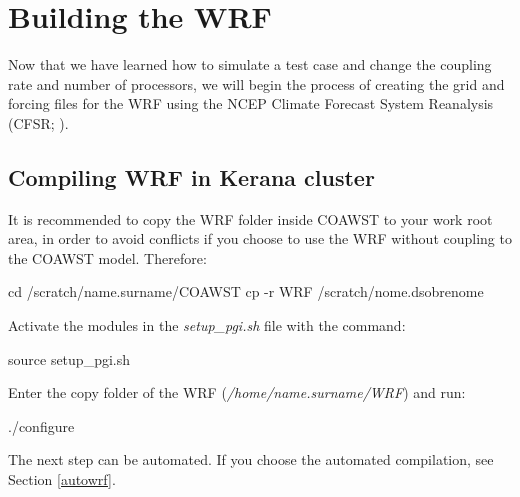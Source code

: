 \chapter{Building the WRF}
\bigskip 
\noindent Now that we have learned how to simulate a test case and change the coupling rate and number of processors, we will begin 
the process of creating the grid and forcing files for the WRF using the NCEP Climate Forecast System Reanalysis (CFSR; \cite{Saha2006}).
\bigskip

\section{Compiling WRF in Kerana cluster}
\bigskip
\noindent It is recommended to copy the WRF folder inside COAWST to your work root area, in order to avoid conflicts
if you choose to use the WRF without coupling to the COAWST model. Therefore:\bigskip

\begin{bashcode}
cd /scratch/name.surname/COAWST
cp -r WRF /scratch/nome.dsobrenome
\end{bashcode}
\bigskip

\noindent Activate the modules in the \textit{setup\_pgi.sh} file with the command:
\bigskip
\begin{bashcode}
source setup_pgi.sh
\end{bashcode}
\bigskip

\noindent Enter the copy folder of the WRF (\textit{/home/name.surname/WRF}) and run:
\bigskip

\begin{bashcode}
./configure
\end{bashcode}
\bigskip

\begin{tcolorbox}[enhanced,
  grow to left by=0cm,%
  grow to right by=0cm,%
  enlarge top by=0cm,%
  enlarge bottom by=0cm,%
  tcbox raise base,
  boxrule=1.0pt,
  left=18mm,
  colframe=green!50!black,coltext=green!25!black,colback=green!10!white,
  overlay={\begin{tcbclipinterior}\fill[green!75!blue!50!white] (frame.south west)
    rectangle node[text=white,font=\sffamily\bfseries\footnotesize,rotate=0] {NOTE} ([xshift=18mm]frame.north west);\end{tcbclipinterior}}]
The next step can be automated. If you choose the automated compilation, see Section \textcolor{bleu_cite}{\ref{autowrf}}.
\end{tcolorbox}
\bigskip

